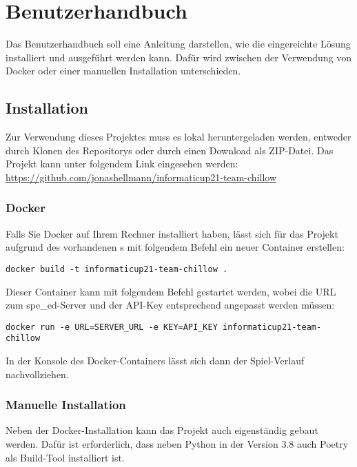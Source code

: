 \chapter{Benutzerhandbuch}
\label{ch:benutzerhandbuch}

Das Benutzerhandbuch soll eine Anleitung darstellen, wie die eingereichte Lösung installiert und ausgeführt werden kann.
Dafür wird zwischen der Verwendung von Docker oder einer manuellen Installation unterschieden.

\section{Installation}
\label{sec:installation}

Zur Verwendung dieses Projektes muss es lokal heruntergeladen werden, entweder durch Klonen des Repositorys oder durch
einen Download als ZIP-Datei.
Das Projekt kann unter folgendem Link eingesehen werden:
\url{https://github.com/jonashellmann/informaticup21-team-chillow}

\subsection{Docker}
\label{subsec:docker}

Falls Sie Docker auf Ihrem Rechner installiert haben, lässt sich für das Projekt aufgrund des vorhandenen
s mit folgendem Befehl ein neuer Container erstellen:

\begin{verbatim}
docker build -t informaticup21-team-chillow .
\end{verbatim}

Dieser Container kann mit folgendem Befehl gestartet werden, wobei die URL zum spe\_ed-Server und der API-Key
entsprechend angepasst werden müssen:

\begin{verbatim}
docker run -e URL=SERVER_URL -e KEY=API_KEY informaticup21-team-chillow
\end{verbatim}

In der Konsole des Docker-Containers lässt sich dann der Spiel-Verlauf nachvollziehen.

\subsection{Manuelle Installation}
\label{subsec:manuelle-installation}

Neben der Docker-Installation kann das Projekt auch eigenständig gebaut werden.
Dafür ist erforderlich, dass neben Python in der Version 3.8 auch Poetry als Build-Tool installiert ist.

